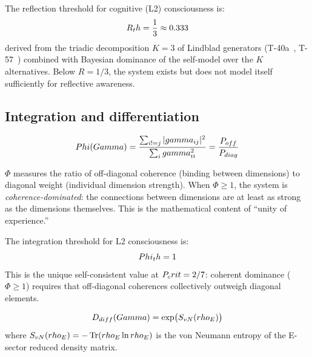 \begin{theorembox}
The reflection threshold for cognitive (L2) consciousness is:
\begin{equation}
  R_th = \frac{1}{3} \approx 0.333
  \label{eq:rth}
\end{equation}
derived from the triadic decomposition $K = 3$ of Lindblad generators (T-40a~,
T-57~) combined with Bayesian dominance of the self-model over the $K$
alternatives. Below $R = 1/3$, the system exists but does not model itself sufficiently
for reflective awareness.
\end{theorembox}

\subsection{Integration and differentiation}
\label{subsec:integration}

\begin{definition}
\begin{equation}
  Phi(Gamma) = \frac{\sum_{i != j} |gamma_{ij}|^2}{\sum_i gamma_{ii}^2}
  = \frac{P_{off}}{P_{diag}}
  \label{eq:phi}
\end{equation}
\end{definition}

$\Phi$ measures the ratio of off-diagonal coherence (binding between dimensions) to
diagonal weight (individual dimension strength). When $\Phi \geq 1$, the system is
\emph{coherence-dominated}: the connections between dimensions are at least as strong
as the dimensions themselves. This is the mathematical content of ``unity of experience.''

\begin{theorembox}
The integration threshold for L2 consciousness is:
\begin{equation}
  Phi_th = 1
  \label{eq:phith}
\end{equation}
This is the unique self-consistent value at $P_crit = 2/7$: coherent dominance
($\Phi \geq 1$) requires that off-diagonal coherences collectively outweigh diagonal
elements.
\end{theorembox}

\begin{definition}
\begin{equation}
  D_{diff}(Gamma) = \exp\bigl(S_{vN}(rho_E)\bigr)
  \label{eq:ddiff}
\end{equation}
where $S_{vN}(rho_E) = -\Tr(rho_E \ln rho_E)$ is the von Neumann entropy
of the E-sector reduced density matrix.
\end{definition}

